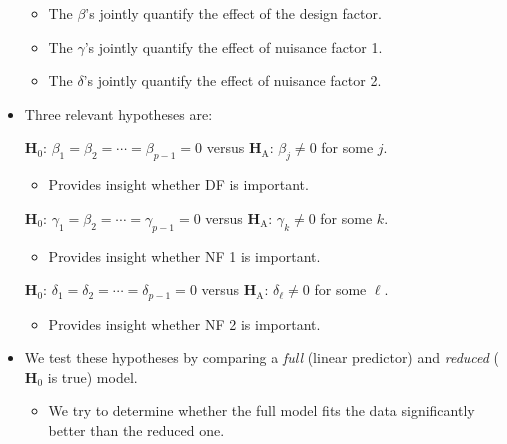 \begin{itemize}
\begin{itemize}
              \item The $\beta$'s jointly quantify the effect of the design factor.
              \item The $\gamma$'s jointly quantify the effect of nuisance factor 1.
              \item The $\delta$'s jointly quantify the effect of nuisance factor 2.
          \end{itemize}
    \item Three relevant hypotheses are:
          \begin{tightcenter}
              $ \mathbf{H}_0 $: $ \beta_1=\beta_2=\cdots=\beta_{p-1}=0 $ versus $ \mathbf{H}_\text{A} $: $ \beta_j\ne 0$ for some $ j $.
              \begin{itemize}
                  \item Provides insight whether DF is important.
              \end{itemize}
              $ \mathbf{H}_0 $: $ \gamma_1=\beta_2=\cdots=\gamma_{p-1}=0 $ versus $ \mathbf{H}_\text{A} $: $ \gamma_k\ne 0$ for some $ k $.
              \begin{itemize}
                  \item Provides insight whether NF 1 is important.
              \end{itemize}
              $ \mathbf{H}_0 $: $ \delta_1=\delta_2=\cdots=\delta_{p-1}=0 $ versus $ \mathbf{H}_\text{A} $: $ \delta_\ell\ne 0$ for some $ \ell $.
              \begin{itemize}
                  \item Provides insight whether NF 2 is important.
              \end{itemize}
          \end{tightcenter}
    \item We test these hypotheses by comparing a \emph{full} (linear predictor) and \emph{reduced} ($ \mathbf{H}_0 $ is true) model.
          \begin{itemize}
              \item We try to determine whether the full model fits the data significantly better than the reduced one.
          \end{itemize}
\end{itemize}
